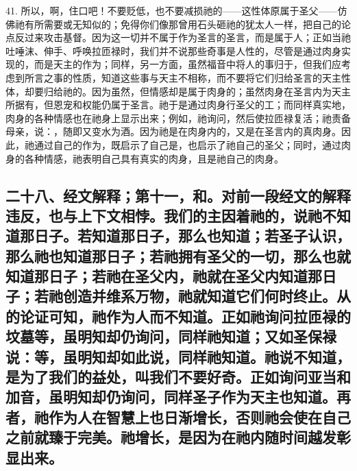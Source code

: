 41. 所以，啊，住口吧！不要贬低，也不要减损祂的——这性体原属于圣父——仿佛祂有所需要或无知似的；免得你们像那曾用石头砸祂的犹太人一样，把自己的论点反过来攻击基督。因为这一切并不属于作为圣言的圣言，而是属于人；正如当祂吐唾沫、伸手、呼唤拉匝禄时，我们并不说那些奇事是人性的，尽管是通过肉身实现的，而是天主的作为；同样，另一方面，虽然福音中将人的事归于，但我们应考虑到所言之事的性质，知道这些事与天主不相称，而不要将它们归给圣言的天主性体，却要归给祂的。因为虽然，但情感却是属于肉身的；虽然肉身在圣言内为天主所据有，但恩宠和权能仍属于圣言。祂于是通过肉身行圣父的工；而同样真实地，肉身的各种情感也在祂身上显示出来；例如，祂询问，然后使拉匝禄复活；祂责备母亲，说：，随即又变水为酒。因为祂是在肉身内的，又是在圣言内的真肉身。因此，祂通过自己的作为，既启示了自己是，也启示了祂自己的圣父；同时，通过肉身的各种情感，祂表明自己具有真实的肉身，且是祂自己的肉身。\par


\subsection{二十八、经文解释；第十一，和。对前一段经文的解释违反，也与上下文相悖。我们的主因着祂的，说祂不知道那日子。若知道那日子，那么也知道；若圣子认识，那么祂也知道那日子；若祂拥有圣父的一切，那么也就知道那日子；若祂在圣父内，祂就在圣父内知道那日子；若祂创造并维系万物，祂就知道它们何时终止。从的论证可知，祂作为人而不知道。正如祂询问拉匝禄的坟墓等，虽明知却仍询问，同样祂知道；又如圣保禄说：等，虽明知却如此说，同样祂知道。祂说不知道，是为了我们的益处，叫我们不要好奇。正如询问亚当和加音，虽明知却仍询问，同样圣子作为天主也知道。再者，祂作为人在智慧上也日渐增长，否则祂会使在自己之前就臻于完美。祂增长，是因为在祂内随时间越发彰显出来。}

